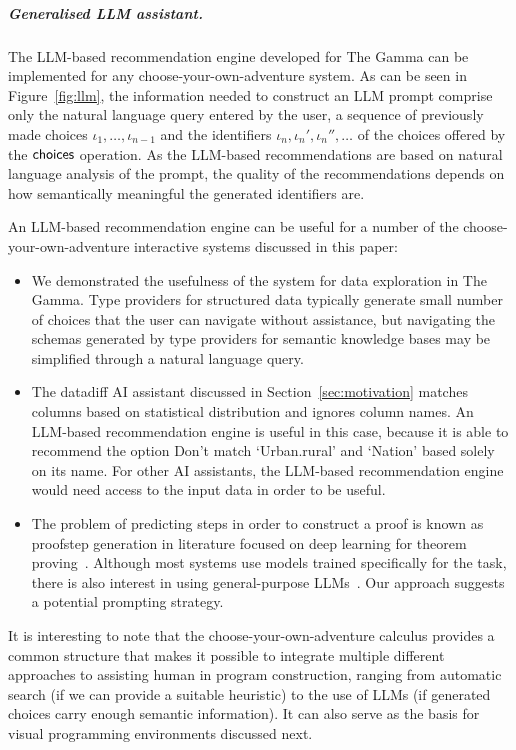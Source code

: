 \documentclass[a4paper,UKenglish,cleveref, autoref, thm-restate]{lipics-v2021}
\newcommand{\ident}[1]{\textsf{#1}}
\newcommand{\choices}{\textnormal{\ident{choices}}}
\begin{document}
\subparagraph{Generalised LLM assistant.}
The LLM-based recommendation engine developed for The Gamma can be implemented for any
choose-your-own-adventure system. As can be seen in Figure~\ref{fig:llm}, the information needed
to construct an LLM prompt comprise only the natural language query entered by the user,
a sequence of previously made choices $\iota_1, \ldots, \iota_{n-1}$ and the identifiers
$\iota_n, \iota_n', \iota_n'', \ldots$ of the choices offered by the $\choices$ operation.
As the LLM-based recommendations are based on natural language analysis of the prompt,
the quality of the recommendations depends on how semantically meaningful the generated
identifiers are.

An LLM-based recommendation engine can be useful for a number of the choose-your-own-adventure
interactive systems discussed in this paper:

\begin{itemize}
\setlength{\itemsep}{5pt}
\item We demonstrated the usefulness of the system for data exploration in The Gamma.
  Type providers for structured data \cite{petricek-2016-fsdata} typically generate small number
  of choices that the user can navigate without assistance, but navigating the schemas generated by
  type providers for semantic knowledge bases \cite{syme-2012-inforich} may be simplified through a
  natural language query.
\item The datadiff AI assistant discussed in Section~\ref{sec:motivation} matches columns based
  on statistical distribution and ignores column names. An LLM-based recommendation engine is
  useful in this case, because it is able to recommend the option \ident{Don't match
  `Urban.rural' and `Nation'} based solely on its name. For other AI assistants, the LLM-based
  recommendation engine would need access to the input data in order to be useful.
\item The problem of predicting steps in order to construct a proof is known as
  proofstep generation in literature focused on deep learning for theorem
  proving~\cite{zhaoyu-2024-deep}. Although most systems use models trained specifically for the
  task, there is also interest in using general-purpose LLMs~\cite{zhang-2023-proofs}.
  Our approach suggests a potential prompting strategy.
\end{itemize}

It is interesting to note that the choose-your-own-adventure calculus provides a common structure
that makes it possible to integrate multiple different approaches to assisting human in program
construction, ranging from automatic search (if we can provide a suitable heuristic) to
the use of LLMs (if generated choices carry enough semantic information). It can also serve as the
basis for visual programming environments discussed next.
\end{document}
